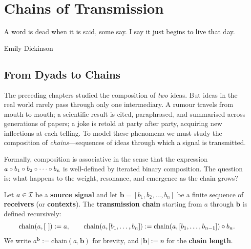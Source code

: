 
\chapter{Chains of Transmission}
\label{ch:chains}

\epigraph{A word is dead when it is said, some say.  I say it just
begins to live that day.}{Emily Dickinson}

\section{From Dyads to Chains}

The preceding chapters studied the composition of \emph{two} ideas.  But ideas
in the real world rarely pass through only one intermediary.  A rumour travels
from mouth to mouth; a scientific result is cited, paraphrased, and summarised
across generations of papers; a joke is retold at party after party, acquiring
new inflections at each telling.  To model these phenomena we must study the
composition of \emph{chains}---sequences of ideas through which a signal is
transmitted.

Formally, composition is associative in the sense that the expression
$a \circ b_1 \circ b_2 \circ \cdots \circ b_n$ is well-defined by
iterated binary composition.  The question is: what happens to the weight,
resonance, and emergence as the chain grows?

\begin{definition}
\label{def:chain}
Let $a \in \mathcal{I}$ be a \textbf{source signal} and let
$\mathbf{b} = [b_1, b_2, \ldots, b_n]$ be a finite sequence of
\textbf{receivers} (or \textbf{contexts}).  The \textbf{transmission chain}
starting from $a$ through $\mathbf{b}$ is defined recursively:
\[
  \mathrm{chain}(a, [~]) := a,
  \qquad
  \mathrm{chain}(a, [b_1, \ldots, b_n])
    := \mathrm{chain}(a, [b_1, \ldots, b_{n-1}]) \circ b_n.
\]
We write $a^{\mathbf{b}} := \mathrm{chain}(a, \mathbf{b})$ for brevity, and
$|\mathbf{b}| := n$ for the \textbf{chain length}.
\end{definition}

